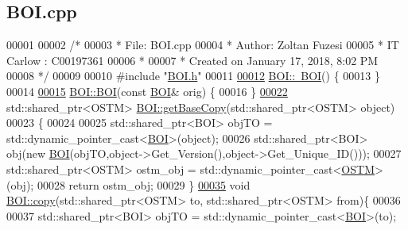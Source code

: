 \hypertarget{_b_o_i_8cpp_source}{}\subsection{B\+O\+I.\+cpp}

\begin{DoxyCode}
00001 
00002 \textcolor{comment}{/* }
00003 \textcolor{comment}{ * File:   BOI.cpp}
00004 \textcolor{comment}{ * Author: Zoltan Fuzesi}
00005 \textcolor{comment}{ * IT Carlow : C00197361}
00006 \textcolor{comment}{ *}
00007 \textcolor{comment}{ * Created on January 17, 2018, 8:02 PM}
00008 \textcolor{comment}{ */}
00009 
00010 \textcolor{preprocessor}{#include "\hyperlink{_b_o_i_8h}{BOI.h}"}
00011 
\hypertarget{_b_o_i_8cpp_source.tex_l00012}{}\hyperlink{class_b_o_i_a617f46a599129178c6b11b4846759a6c_a617f46a599129178c6b11b4846759a6c}{00012} \hyperlink{class_b_o_i_a617f46a599129178c6b11b4846759a6c_a617f46a599129178c6b11b4846759a6c}{BOI::~BOI}() \{
00013 \}
00014 
\hypertarget{_b_o_i_8cpp_source.tex_l00015}{}\hyperlink{class_b_o_i_a7757de8d3ac656871bed4b07d77457ff_a7757de8d3ac656871bed4b07d77457ff}{00015} \hyperlink{class_b_o_i_a6af682a5f199a029681f0cb2b8658706_a6af682a5f199a029681f0cb2b8658706}{BOI::BOI}(\textcolor{keyword}{const} \hyperlink{class_b_o_i}{BOI}& orig) \{
00016 \}
\hypertarget{_b_o_i_8cpp_source.tex_l00022}{}\hyperlink{class_b_o_i_ad53ae2918a656793b9d7a670d35ecfa3_ad53ae2918a656793b9d7a670d35ecfa3}{00022} std::shared\_ptr<OSTM> \hyperlink{class_b_o_i_ad53ae2918a656793b9d7a670d35ecfa3_ad53ae2918a656793b9d7a670d35ecfa3}{BOI::getBaseCopy}(std::shared\_ptr<OSTM> \textcolor{keywordtype}{object})
00023 \{
00024 
00025     std::shared\_ptr<BOI> objTO = std::dynamic\_pointer\_cast<\hyperlink{class_b_o_i}{BOI}>(object);
00026     std::shared\_ptr<BOI> obj(\textcolor{keyword}{new} \hyperlink{class_b_o_i_a6af682a5f199a029681f0cb2b8658706_a6af682a5f199a029681f0cb2b8658706}{BOI}(objTO,object->Get\_Version(),\textcolor{keywordtype}{object}->Get\_Unique\_ID())); 
00027     std::shared\_ptr<OSTM> ostm\_obj = std::dynamic\_pointer\_cast<\hyperlink{class_o_s_t_m}{OSTM}>(obj);
00028     \textcolor{keywordflow}{return} ostm\_obj;
00029 \}
\hypertarget{_b_o_i_8cpp_source.tex_l00035}{}\hyperlink{class_b_o_i_a9ff2d32c25c23a1bea6316f50c3bf677_a9ff2d32c25c23a1bea6316f50c3bf677}{00035} \textcolor{keywordtype}{void} \hyperlink{class_b_o_i_a9ff2d32c25c23a1bea6316f50c3bf677_a9ff2d32c25c23a1bea6316f50c3bf677}{BOI::copy}(std::shared\_ptr<OSTM> to, std::shared\_ptr<OSTM> from)\{
00036 
00037     std::shared\_ptr<BOI> objTO = std::dynamic\_pointer\_cast<\hyperlink{class_b_o_i}{BOI}>(to);

\end{DoxyCode}
